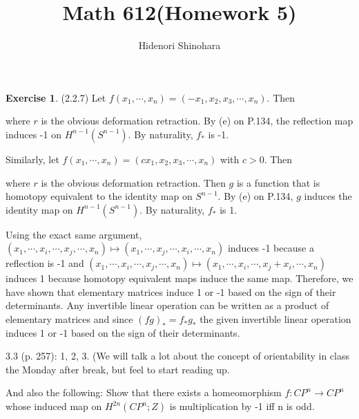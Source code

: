 \documentclass[12pt, psamsfonts]{amsart}
\theoremstyle{definition}
\newtheorem*{exer}{Exercise}
\theoremstyle{remark}
\numberwithin{equation}{section}
\begin{document}
\title{Math 612(Homework 5)}
\author{Hidenori Shinohara}
\maketitle

\begin{exer}{(2.2.7)}
  Let $f(x_1, \cdots, x_n) = (-x_1, x_2, x_3, \cdots, x_n)$.
  Then
  \begin{center}
  \end{center}
  where $r$ is the obvious deformation retraction.
  By (e) on P.134, the reflection map induces -1 on $H^{n - 1}(S^{n - 1})$.
  By naturality, $f_{\ast}$ is -1.

  Similarly, let $f(x_1, \cdots, x_n) = (cx_1, x_2, x_3, \cdots, x_n)$ with $c > 0$.
  Then
  \begin{center}
  \end{center}
  where $r$ is the obvious deformation retraction.
  Then $g$ is a function that is homotopy equivalent to the identity map on $S^{n - 1}$.
  By (e) on P.134, $g$ induces the identity map on $H^{n - 1}(S^{n - 1})$.
  By naturality, $f_{\ast}$ is 1.

  Using the exact same argument, $(x_1, \cdots, x_i, \cdots, x_j, \cdots, x_n) \mapsto (x_1, \cdots, x_j, \cdots, x_i, \cdots, x_n)$ induces -1 because a reflection is -1 and $(x_1, \cdots, x_i, \cdots, x_j, \cdots, x_n) \mapsto (x_1, \cdots, x_i, \cdots, x_j + x_i, \cdots, x_n)$ induces 1 because homotopy equivalent maps induce the same map.
  Therefore, we have shown that elementary matrices induce 1 or -1 based on the sign of their determinants.
  Any invertible linear operation can be written as a product of elementary matrices and since $(fg)_{\ast} = f_{\ast}g_{\ast}$ the given invertible linear operation induces 1 or -1 based on the sign of their determinants.
\end{exer}

3.3 (p. 257): 1, 2, 3. (We will talk a lot about the concept of orientability in class the Monday after break, but feel to start reading up.

And also the following: Show that there exists a homeomorphism $f: CP^n \to CP^n$ whose induced map on $H^{2n}(CP^n;Z)$ is multiplication by -1 iff n is odd.
\end{document}
